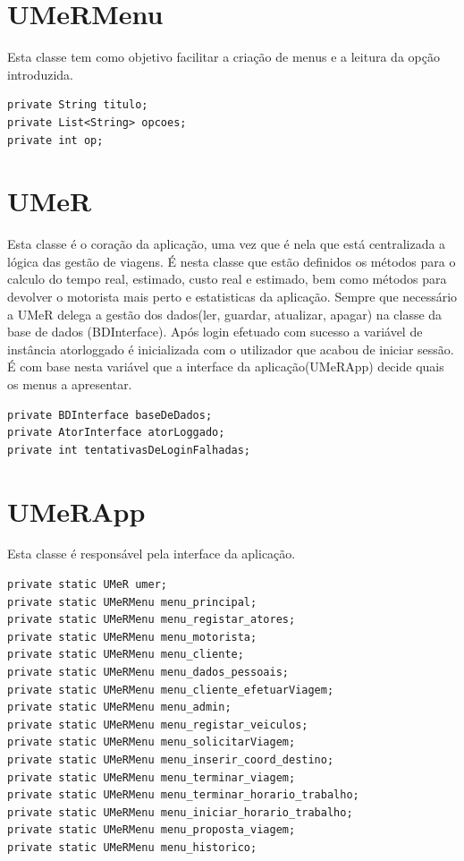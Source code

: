 \section{UMeRMenu}

Esta classe tem como objetivo facilitar a criação de menus e a leitura da opção introduzida. 

\begin{verbatim}
private String titulo;
private List<String> opcoes;
private int op;
\end{verbatim}

\section{UMeR}

Esta classe é o coração da aplicação, uma vez que é nela que está centralizada a lógica das gestão de viagens. É nesta classe que estão definidos os métodos para o calculo do tempo real, estimado, custo real e estimado, bem como métodos para devolver o motorista mais perto e estatisticas da aplicação. Sempre que necessário a UMeR delega a gestão dos dados(ler, guardar, atualizar, apagar) na classe da base de dados (BDInterface). 
Após login efetuado com sucesso a variável de instância atorloggado é inicializada com o utilizador que acabou de iniciar sessão. É com base nesta variável que a interface da aplicação(UMeRApp) decide quais os menus a apresentar.  

\begin{verbatim}
private BDInterface baseDeDados;
private AtorInterface atorLoggado;
private int tentativasDeLoginFalhadas;
\end{verbatim}

\section{UMeRApp}

Esta classe é responsável pela interface da aplicação. 

\begin{verbatim}
private static UMeR umer;
private static UMeRMenu menu_principal;
private static UMeRMenu menu_registar_atores;
private static UMeRMenu menu_motorista;
private static UMeRMenu menu_cliente;
private static UMeRMenu menu_dados_pessoais;
private static UMeRMenu menu_cliente_efetuarViagem;
private static UMeRMenu menu_admin;
private static UMeRMenu menu_registar_veiculos;
private static UMeRMenu menu_solicitarViagem; 
private static UMeRMenu menu_inserir_coord_destino;
private static UMeRMenu menu_terminar_viagem; 
private static UMeRMenu menu_terminar_horario_trabalho;
private static UMeRMenu menu_iniciar_horario_trabalho;
private static UMeRMenu menu_proposta_viagem;
private static UMeRMenu menu_historico;
\end{verbatim}




